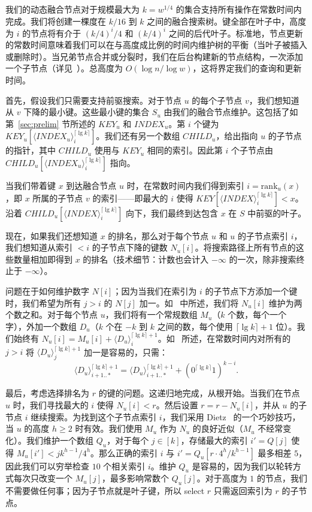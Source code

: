 \documentclass[11pt,a4paper]{ctexart}
\newcommand{\tto}{\text{0}}
\newcommand{\ttl}{\text{1}}
\newcommand{\lpiece}[3]{\langle #1 \rangle_{#2}^{#3}}
\newcommand{\RANK}{\text{rank}}
\newcommand{\ceiling}[1]{\lceil #1 \rceil}
\begin{document}
我们的动态融合节点对于规模最大为 $k = w^{1/4}$ 的集合支持所有操作在常数时间内完成。我们将创建一棵度在 $k/16$ 到 $k$ 之间的融合搜索树。键全部在叶子中，高度为 $i$ 的节点将有介于 $(k/4)^i/4$ 和 $(k/4)^i$ 之间的后代叶子。标准地，节点更新的常数时间意味着我们可以在与高度成比例的时间内维护树的平衡（当叶子被插入或删除时）。当兄弟节点合并或分裂时，我们在后台构建新的节点结构，一次添加一个子节点（详见~\cite[第3节]{andersson07exptrees}）。总高度为 $O(\log n/\log w)$，这将界定我们的查询和更新时间。

首先，假设我们只需要支持前驱搜索。对于节点 $u$ 的每个子节点 $v$，我们想知道从 $v$ 下降的最小键。这些最小键的集合 $S_u$ 由我们的融合节点维护。这包括了如第~\ref{sec:prelim} 节所述的 $KEY_u$ 和 $INDEX_u$。第 $i$ 个键为 $KEY_u[\lpiece{INDEX_u}{i}{\ceiling{\lg k}}]$。我们还有另一个数组 $CHILD_u$，给出指向 $u$ 的子节点的指针，其中 $CHILD_u$ 使用与 $KEY_u$ 相同的索引。因此第 $i$ 个子节点由 $CHILD_u[\lpiece{INDEX_u}{i}{\ceiling{\lg k}}]$ 指向。

当我们带着键 $x$ 到达融合节点 $u$ 时，在常数时间内我们得到索引 $i = \RANK_u(x)$，即 $x$ 所属的子节点 $v$ 的索引——即最大的 $i$ 使得 $KEY[\lpiece{INDEX}{i}{\ceiling{\lg k}}] < x$。沿着 $CHILD_u[\lpiece{INDEX}{i}{\ceiling{\lg k}}]$ 向下，我们最终到达包含 $x$ 在 $S$ 中前驱的叶子。

现在，如果我们还想知道 $x$ 的排名，那么对于每个节点 $u$ 和 $u$ 的子节点索引 $i$，我们想知道从索引 $< i$ 的子节点下降的键数 $N_u[i]$。将搜索路径上所有节点的这些数量相加即得到 $x$ 的排名（技术细节：计数也会计入 $-\infty$ 的一次，除非搜索终止于 $-\infty$）。

问题在于如何维护数字 $N[i]$；因为当我们在索引为 $i$ 的子节点下方添加一个键时，我们希望为所有 $j > i$ 的 $N[j]$ 加一。如~\cite[第8节]{patrascu04connect} 中所述，我们将 $N_u[i]$ 维护为两个数之和。对于每个节点 $u$，我们将有一个常规数组 $M_u$（$k$ 个数，每个一个字），外加一个数组 $D_u$（$k$ 个在 $-k$ 到 $k$ 之间的数，每个使用 $\ceiling{\lg k}+1$ 位）。我们始终有 $N_u[i] = M_u[i] + \lpiece{D_u}{i}{\ceiling{\lg k}+1}$。如~\cite[第8节]{patrascu04connect} 所述，在常数时间内对所有的 $j > i$ 将 $\lpiece{D_u}{j}{\ceiling{\lg k}+1}$ 加一是容易的，只需：
\[
\lpiece{D_u}{i+1..*}{\ceiling{\lg k}+1} = \lpiece{D_u}{i+1..*}{\ceiling{\lg k}+1} + (\tto^{\ceiling{\lg k}}\ttl)^{k-i}.
\]

最后，考虑选择排名为 $r$ 的键的问题。这递归地完成，从根开始。当我们在节点 $u$ 时，我们寻找最大的 $i$ 使得 $N_u[i] < r$。然后设置 $r = r - N_u[i]$，并从 $u$ 的子节点 $i$ 继续搜索。为找到这个子节点索引 $i$，我们采用 Dietz~\cite{dietz89sums} 的一个巧妙技巧，当 $u$ 的高度 $h \geq 2$ 时有效。我们使用 $M_u$ 作为 $N_u$ 的良好近似（$M_u$ 不经常变化）。我们维护一个数组 $Q_u$，对于每个 $j \in [k]$，存储最大的索引 $i' = Q[j]$ 使得 $M_u[i'] < j k^{h-1}/4^h$。那么正确的索引 $i$ 与 $i' = Q_u[r \cdot 4^h/k^{h-1}]$ 最多相差 $5$，因此我们可以穷举检查 $10$ 个相关索引 $i$。维护 $Q_u$ 是容易的，因为我们以轮转方式每次只改变一个 $M_u[j]$，最多影响常数个 $Q_u[j]$。对于高度为 $1$ 的节点，我们不需要做任何事；因为子节点就是叶子键，所以 select $r$ 只需返回索引为 $r$ 的子节点。
\end{document}
